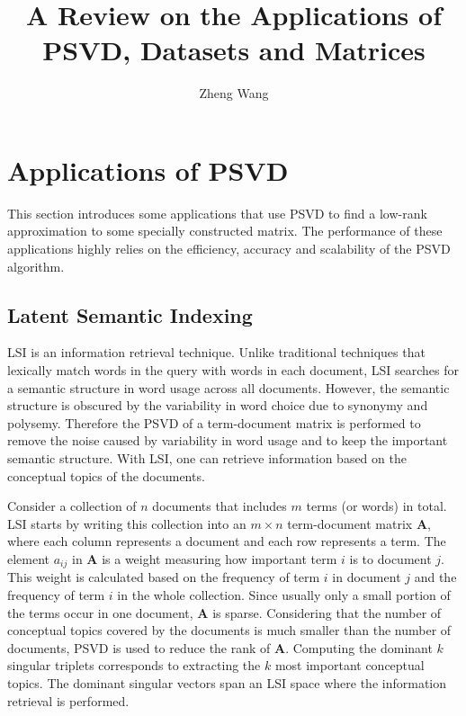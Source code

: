 \documentclass[11pt]{article}
\numberwithin{equation}{section}
\numberwithin{figure}{section}
\numberwithin{table}{section}
\begin{document}
\title{A Review on the Applications of PSVD, Datasets and Matrices}

\author{Zheng Wang}

\maketitle

\section{Applications of PSVD}
\label{apps}

This section introduces some applications that use PSVD to find a low-rank approximation to some specially constructed matrix. The performance of these applications highly relies on the efficiency, accuracy and scalability of the PSVD algorithm.

\subsection{Latent Semantic Indexing}
\label{LSI}

LSI \cite{intro2IR}\cite{LSI_SVD}\cite{LSI} is an information retrieval technique. Unlike traditional techniques that lexically match words in the query with words in each document, LSI searches for a semantic structure in word usage across all documents. However, the semantic structure is obscured by the variability in word choice due to synonymy and polysemy. Therefore the PSVD of a term-document matrix is performed to remove the noise caused by variability in word usage and to keep the important semantic structure. With LSI, one can retrieve information based on the conceptual topics of the documents.

Consider a collection of $n$ documents that includes $m$ terms (or words) in total. LSI starts by writing this collection into an $m\times n$ term-document matrix $\mathbf{A}$, where each column represents a document and each row represents a term. The element $a_{ij}$ in $\mathbf{A}$ is a weight measuring how important term $i$ is to document $j$. This weight is calculated based on the frequency of term $i$ in document $j$ and the frequency of term $i$ in the whole collection. Since usually only a small portion of the terms occur in one document, $\mathbf{A}$ is sparse. Considering that the number of conceptual topics covered by the documents is much smaller than the number of documents, PSVD is used to reduce the rank of $\mathbf{A}$. Computing the dominant $k$ singular triplets corresponds to extracting the $k$ most important conceptual topics. The dominant singular vectors span an LSI space where the information retrieval is performed.
\end{document}
